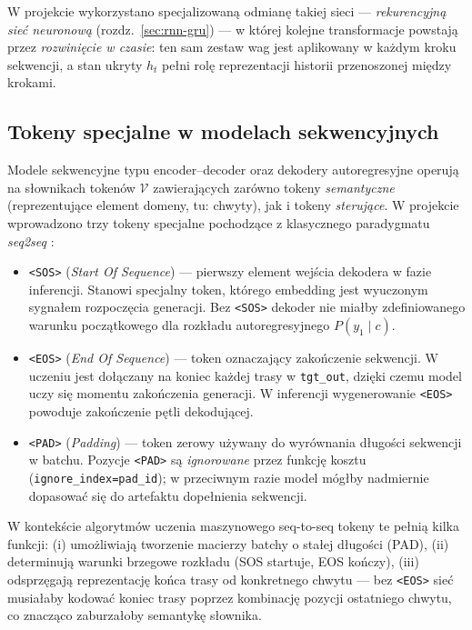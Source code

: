\documentclass[12pt,a4paper]{article}
\begin{document}
W projekcie wykorzystano specjalizowaną odmianę takiej sieci --- \emph{rekurencyjną sieć neuronową} (rozdz.~\ref{sec:rnn-gru}) --- w której kolejne transformacje powstają przez \emph{rozwinięcie w czasie}: ten sam zestaw wag jest aplikowany w każdym kroku sekwencji, a stan ukryty $h_t$ pełni rolę reprezentacji historii przenoszonej między krokami.

\subsection{Tokeny specjalne w modelach sekwencyjnych}
\label{sec:special-tokens}

Modele sekwencyjne typu encoder--decoder oraz dekodery autoregresyjne operują na słownikach tokenów $\mathcal{V}$ zawierających zarówno tokeny \emph{semantyczne} (reprezentujące element domeny, tu: chwyty), jak i tokeny \emph{sterujące}. W projekcie wprowadzono trzy tokeny specjalne pochodzące z klasycznego paradygmatu \textit{seq2seq} \citep{sutskever2014seq2seq}:

\begin{itemize}[leftmargin=1.5em]
    \item \texttt{<SOS>} (\textit{Start Of Sequence}) --- pierwszy element wejścia dekodera w fazie inferencji. Stanowi specjalny token, którego embedding jest wyuczonym sygnałem rozpoczęcia generacji. Bez \texttt{<SOS>} dekoder nie miałby zdefiniowanego warunku początkowego dla rozkładu autoregresyjnego $P(y_1\mid c)$.
    \item \texttt{<EOS>} (\textit{End Of Sequence}) --- token oznaczający zakończenie sekwencji. W uczeniu jest dołączany na koniec każdej trasy w \texttt{tgt\_out}, dzięki czemu model uczy się momentu zakończenia generacji. W inferencji wygenerowanie \texttt{<EOS>} powoduje zakończenie pętli dekodującej.
    \item \texttt{<PAD>} (\textit{Padding}) --- token zerowy używany do wyrównania długości sekwencji w batchu. Pozycje \texttt{<PAD>} są \emph{ignorowane} przez funkcję kosztu (\texttt{ignore\_index=pad\_id}); w przeciwnym razie model mógłby nadmiernie dopasować się do artefaktu dopełnienia sekwencji.
\end{itemize}

W kontekście algorytmów uczenia maszynowego seq-to-seq tokeny te pełnią kilka funkcji: (i) umożliwiają tworzenie macierzy batchy o stałej długości (PAD), (ii) determinują warunki brzegowe rozkładu (SOS startuje, EOS kończy), (iii) odsprzęgają reprezentację końca trasy od konkretnego chwytu --- bez \texttt{<EOS>} sieć musiałaby kodować koniec trasy poprzez kombinację pozycji ostatniego chwytu, co znacząco zaburzałoby semantykę słownika.
\end{document}

